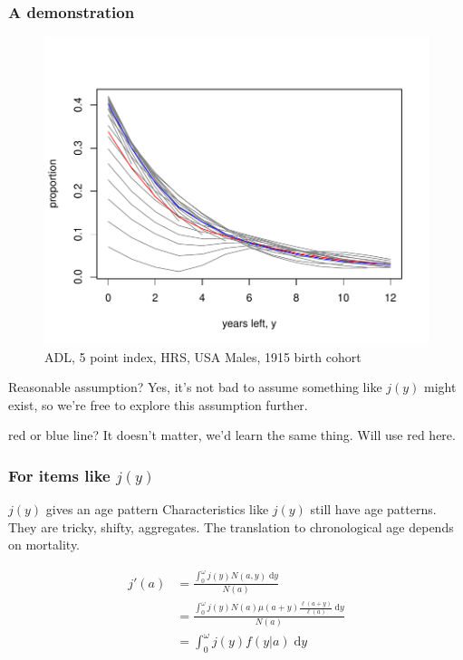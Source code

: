 \documentclass[20pt]{beamer}
\newcommand{\dd}{\; \mathrm{d}}
\begin{document}
\begin{frame}
\frametitle{A demonstration}
\begin{figure}[b]
    \centering
    \caption{ADL, 5 point index, HRS, USA Males, 1915 birth
    cohort}
    \vspace{-3em}
    \includegraphics[scale=1.2]{Figures/LinesExample.pdf}
\end{figure} 
\end{frame}

\begin{frame}
\begin{block}{Reasonable assumption?}
Yes, it's not bad to assume something like $j(y)$ might exist, so we're free to
explore this assumption further. 
\end{block}

\begin{block}{red or blue line?}
It doesn't matter, we'd learn the same thing. Will use red here.
\end{block}
\end{frame}

\begin{frame}
\frametitle{For items like $j(y)$}

\begin{block}{$j(y)$ gives an age pattern}
Characteristics like $j(y)$ still have age patterns. They are tricky, shifty,
aggregates. The translation to chronological age depends on mortality.
\end{block}
\begin{align}
j'(a) &= \frac{\int _0^\omega j(y) N(a,y) \dd y}{N(a)} \\
      &= \frac{\int _0^\omega j(y) N(a) \mu(a+y)\frac{\ell(a+y)}{\ell(a)}\dd y}{N(a)}\\
      &= \int _0^\omega j(y) f(y|a)\dd y
\end{align}

\end{frame}
\end{document}
